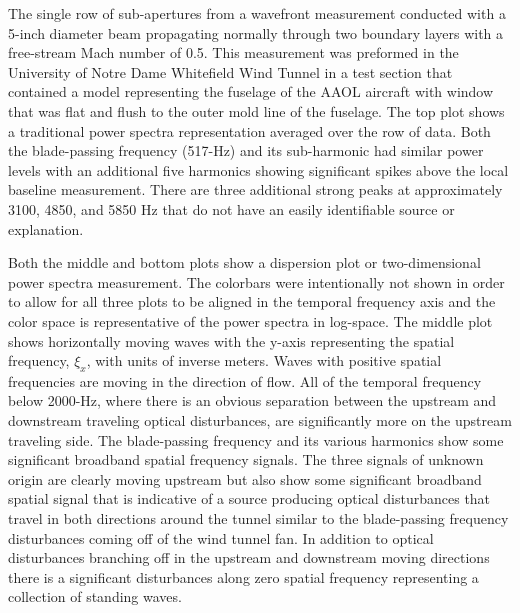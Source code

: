 The single row of sub-apertures from a wavefront measurement conducted with a 5-inch diameter beam propagating normally through two boundary layers with a free-stream Mach number of 0.5.
This measurement was preformed in the University of Notre Dame Whitefield Wind Tunnel in a test section that contained a model representing the fuselage of the AAOL aircraft \cite{Jumper-2013-8KtN3pue} with window that was flat and flush to the outer mold line of the fuselage.
The top plot shows a traditional power spectra representation averaged over the row of data.
Both the blade-passing frequency (517-Hz) and its sub-harmonic had similar power levels with an additional five harmonics showing significant spikes above the local baseline measurement.
There are three additional strong peaks at approximately 3100, 4850, and 5850 Hz that do not have an easily identifiable source or explanation.

Both the middle and bottom plots show a dispersion plot or two-dimensional power spectra measurement.
The colorbars were intentionally not shown in order to allow for all three plots to be aligned in the temporal frequency axis and the color space is representative of the power spectra in log-space.
The middle plot shows horizontally moving waves with the y-axis representing the spatial frequency, $\xi_x$, with units of inverse meters.
Waves with positive spatial frequencies are moving in the direction of flow.
All of the temporal frequency below 2000-Hz, where there is an obvious separation between the upstream and downstream traveling optical disturbances, are significantly more on the upstream traveling side.
The blade-passing frequency and its various harmonics show some significant broadband spatial frequency signals.
The three signals of unknown origin are clearly moving upstream but also show some significant broadband spatial signal that is indicative of a source producing optical disturbances that travel in both directions around the tunnel similar to the blade-passing frequency disturbances coming off of the wind tunnel fan.
In addition to optical disturbances branching off in the upstream and downstream moving directions there is a significant disturbances along zero spatial frequency representing a collection of standing waves.

